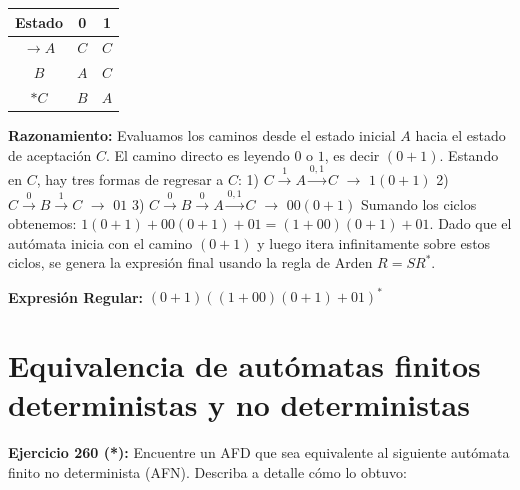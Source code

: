 \documentclass[12pt]{article}
\begin{document}
\begin{itemize}
    \begin{minipage}{0.4\textwidth}
    \begin{tabular}{|c|c|c|}
    \hline
    \textbf{Estado} & \textbf{0} & \textbf{1} \\
    \hline
    $\rightarrow A$ & $C$ & $C$ \\
    \hline
    $B$ & $A$ & $C$ \\
    \hline
    $*C$ & $B$ & $A$ \\
    \hline
    \end{tabular}
    \end{minipage}
    \begin{minipage}{0.5\textwidth}
    \end{minipage}

    \vspace{0.2cm}
    \textbf{Razonamiento:} Evaluamos los caminos desde el estado inicial $A$ hacia el estado de aceptación $C$. El camino directo es leyendo $0$ o $1$, es decir $(0+1)$. Estando en $C$, hay tres formas de regresar a $C$:
    1) $C \xrightarrow{1} A \xrightarrow{0,1} C$ $\rightarrow$ $1(0+1)$
    2) $C \xrightarrow{0} B \xrightarrow{1} C$ $\rightarrow$ $01$
    3) $C \xrightarrow{0} B \xrightarrow{0} A \xrightarrow{0,1} C$ $\rightarrow$ $00(0+1)$
    Sumando los ciclos obtenemos: $1(0+1) + 00(0+1) + 01 = (1+00)(0+1) + 01$. Dado que el autómata inicia con el camino $(0+1)$ y luego itera infinitamente sobre estos ciclos, se genera la expresión final usando la regla de Arden $R = S R^*$.
    
    \textbf{Expresión Regular:} $(0+1)((1+00)(0+1) + 01)^*$
\end{itemize}
\section*{Equivalencia de autómatas finitos deterministas y no deterministas}

\textbf{Ejercicio 260 (*):} Encuentre un AFD que sea equivalente al siguiente autómata finito no determinista (AFN). Describa a detalle cómo lo obtuvo:
\end{document}
